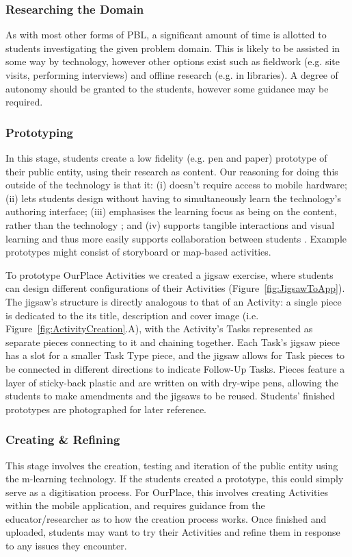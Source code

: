 \subsubsection{Researching the Domain}
As with most other forms of PBL, a significant amount of time is allotted to students investigating the given problem domain. This is likely to be assisted in some way by technology, however other options exist such as fieldwork (e.g. site visits, performing interviews) and offline research (e.g. in libraries). A degree of autonomy should be granted to the students, however some guidance may be required.

\subsubsection{Prototyping}
In this stage, students create a low fidelity (e.g. pen and paper) prototype of their public entity, using their research as content. Our reasoning for doing this outside of the technology is that it: (i) doesn't require access to mobile hardware; (ii) lets students design without having to simultaneously learn the technology's authoring interface; (iii) emphasises the learning focus as being on the content, rather than the technology \cite{Bell2010}; and (iv) supports tangible interactions and visual learning and thus more easily supports collaboration between students \cite{Stanton2001}. Example prototypes might consist of storyboard or map-based activities.

To prototype OurPlace Activities we created a jigsaw exercise, where students can design different configurations of their Activities (Figure~\ref{fig:JigsawToApp}). The jigsaw's structure is directly analogous to that of an Activity: a single piece is dedicated to the its title, description and cover image (i.e. Figure~\ref{fig:ActivityCreation}.A), with the Activity's Tasks represented as separate pieces connecting to it and chaining together. Each Task's jigsaw piece has a slot for a smaller Task Type piece, and the jigsaw allows for Task pieces to be connected in different directions to indicate Follow-Up Tasks. Pieces feature a layer of sticky-back plastic and are written on with dry-wipe pens, allowing the students to make amendments and the jigsaws to be reused. Students' finished prototypes are photographed for later reference.

\subsubsection{Creating \& Refining}
This stage involves the creation, testing and iteration of the public entity using the m-learning technology. If the students created a prototype, this could simply serve as a digitisation process. For OurPlace, this involves creating Activities within the mobile application, and requires guidance from the educator/researcher as to how the creation process works. Once finished and uploaded, students may want to try their Activities and refine them in response to any issues they encounter. 

